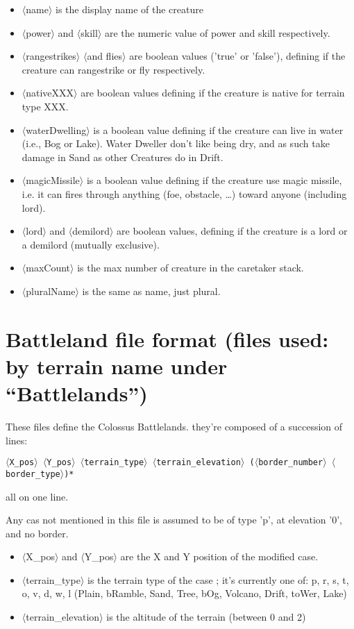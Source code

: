 \documentclass{article}
\begin{document}
\begin{itemize}
\item $\langle$name$\rangle$ is the display name of the creature
\item $\langle$power$\rangle$ and $\langle$skill$\rangle$ are the numeric value of power and skill respectively.
\item $\langle$rangestrikes$\rangle$ $\langle$and flies$\rangle$ are boolean values ('true' or 'false'), defining if the creature can rangestrike or fly respectively.
\item $\langle$nativeXXX$\rangle$ are boolean values defining if the creature is native for terrain type XXX.
\item $\langle$waterDwelling$\rangle$ is a boolean value defining if the creature can live in water (i.e., Bog or Lake). Water Dweller don't like being dry, and as such take damage in Sand as other Creatures do in Drift.
\item $\langle$magicMissile$\rangle$ is a boolean value defining if the creature use magic missile, i.e. it can fires through anything (foe, obstacle, \ldots) toward anyone (including lord).
\item $\langle$lord$\rangle$ and $\langle$demilord$\rangle$ are boolean values, defining if the creature is a lord or a demilord (mutually exclusive).
\item $\langle$maxCount$\rangle$ is the max number of creature in the caretaker stack.
\item $\langle$pluralName$\rangle$ is the same as name, just plural.
\end{itemize}

\section{Battleland file format (files used: by terrain name under ``Battlelands'')}

These files define the Colossus Battlelands. they're composed of a succession of lines:

\texttt{$\langle$X\_pos$\rangle$ $\langle$Y\_pos$\rangle$ $\langle$terrain\_type$\rangle$ $\langle$terrain\_elevation$\rangle$ ($\langle$border\_number$\rangle$ $\langle$border\_type$\rangle$)*}

all on one line.

Any cas not mentioned in this file is assumed to be of type 'p', at elevation '0', and no border.

\begin{itemize}
\item $\langle$X\_pos$\rangle$ and $\langle$Y\_pos$\rangle$ are the X and Y position of the modified case.
\item $\langle$terrain\_type$\rangle$ is the terrain type of the case ; it's currently one of: p, r, s, t, o, v, d, w, l (Plain, bRamble, Sand, Tree, bOg, Volcano, Drift, toWer, Lake)
\item $\langle$terrain\_elevation$\rangle$ is the altitude of the terrain (between 0 and 2)
\end{itemize}
\end{document}
